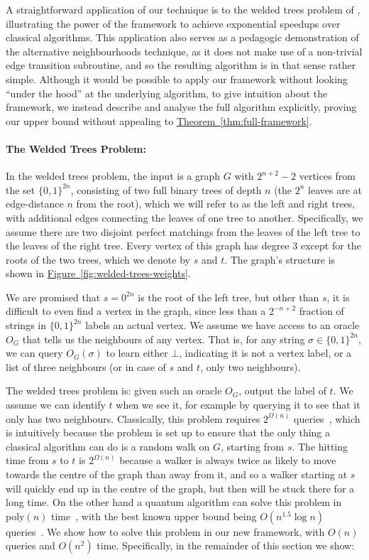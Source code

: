 \documentclass{theoretics}
\newcommand{\thm}[1]{\hyperref[thm:#1]{Theorem~\ref*{thm:#1}}}
\newcommand{\fig}[1]{\hyperref[fig:#1]{Figure~\ref*{fig:#1}}}
\renewcommand{\>}{\rangle}
\newcommand{\<}{\langle}
\renewcommand{\(}{\left(}
\renewcommand{\)}{\right)}
\begin{document}
A straightforward application of our technique is to the welded trees problem of \cite{childs2003ExpSpeedupQW}, illustrating the power of the framework to achieve exponential speedups over classical algorithms. This application also serves as a pedagogic demonstration of the alternative neighbourhoods technique, as it does not make use of a non-trivial edge transition subroutine, and so the resulting algorithm is in that sense rather simple. Although it would be possible to apply our framework without looking ``under the hood'' at the underlying algorithm, to give intuition about the framework, we instead describe and analyse the full algorithm explicitly, proving our upper bound without appealing to \thm{full-framework}. 

\paragraph{The Welded Trees Problem:} In the welded trees problem, the input is a graph $G$ with $2^{n+2}-2$ vertices from the set $\{0,1\}^{2n}$, consisting of two full binary trees of depth $n$ (the $2^n$ leaves are at edge-distance $n$ from the root), which we will refer to as the left and right trees, with additional edges connecting the leaves of one tree to another. Specifically, we assume there are two disjoint perfect matchings from the leaves of the left tree to the leaves of the right tree. Every vertex of this graph has degree 3 except for the roots of the two trees, which we denote by $s$ and $t$. The graph's structure is shown in \fig{welded-trees-weights}.

We are promised that $s=0^{2n}$ is the root of the left tree, but other than $s$, it is difficult to even find a vertex in the graph, since less than a $2^{-n+2}$ fraction of strings in $\{0,1\}^{2n}$ labels an actual vertex. We assume we have access to an oracle $O_G$ that tells us the neighbours of any vertex.
That is, for any string $\sigma\in\{0,1\}^{2n}$, we can query $O_G(\sigma)$ to learn either $\bot$, indicating it is not a vertex label, or a list of three neighbours (or in case of $s$ and $t$, only two neighbours). 

The welded trees problem is: given such an oracle $O_G$, output the label of $t$. We assume we can identify $t$ when we see it, for example by querying it to see that it only has two neighbours. Classically, this problem requires $2^{\Omega(n)}$ queries~\cite{childs2003ExpSpeedupQW}, which is intuitively because the problem is set up to ensure that the only thing a classical algorithm can do is a random walk on $G$, starting from $s$. The hitting time from $s$ to $t$ is $2^{\Omega(n)}$ because a walker is always twice as likely to move towards the centre of the graph than away from it, and so a walker starting at $s$ will quickly end up in the centre of the graph, but then will be stuck there for a long time. 
On the other hand a quantum algorithm can solve this problem in poly$(n)$ time~\cite{childs2003ExpSpeedupQW}, with the best known upper bound being $O(n^{1.5}\log n)$ queries~\cite{atia2021welded}. We show how to solve this problem in our new framework, with $O(n)$ queries and ${O}(n^2)$ time. Specifically, in the remainder of this section we show:
\end{document}
